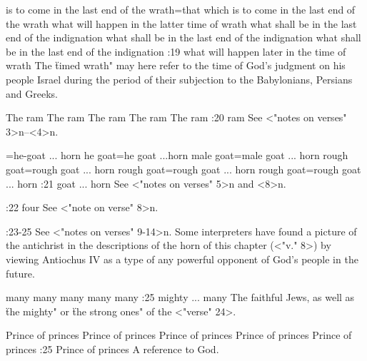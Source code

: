     {is to come in the last end of the wrath}={that which is to come in the last end of the wrath} %
    {what will happen in the latter time of wrath} %
    {what shall be in the last end of the indignation} %
    {what shall be in the last end of the indignation} %
    {what shall be in the last end of the indignation} %
:19 {what will happen later in the time of wrath} The \"timed wrath" may here refer to the time of God's judgment on his people 
Israel during the period of their subjection to the Babylonians, Persians and Greeks.

    {The ram} %
    {The ram} %
    {The ram} %
    {The ram} %
    {The ram} %
:20 {ram} See <"notes on verses" 3>n--<4>n.


={he-goat ... horn} %
    {he goat}={he goat ...horn } %
    {male goat}={male goat ...  horn} %
    {rough goat}={rough goat ...  horn} %
    {rough goat}={rough goat ...  horn} %
    {rough goat}={rough goat ...  horn} %
:21 {goat ... horn} See <"notes on verses" 5>n and <8>n.

:22 {four} See <"note on verse" 8>n.

:23-25 {}  See <"notes on verses" 9-14>n. Some interpreters have found a picture of the antichrist in the descriptions of the horn of this 
chapter (<"v." 8>) by viewing Antiochus IV as a type of any powerful opponent of God's people in the future.

    {many} %
    {many} %
    {many} %
    {many} %
    {many} %
:25 {mighty ... many} The faithful Jews, as well as \"the mighty" or \"the strong ones" of the <"verse" 24>.

    {Prince of princes} %
    {Prince of princes} %
    {Prince of princes} %
    {Prince of princes} %
    {Prince of princes} %
:25 {Prince of princes} A reference to God. 


